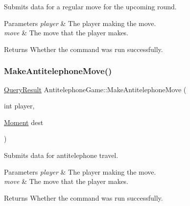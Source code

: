 Submits data for a regular move for the upcoming round. 


\begin{DoxyParams}{Parameters}
{\em player} & The player making the move. \\
\hline
{\em move} & The move that the player makes. \\
\hline
\end{DoxyParams}
\begin{DoxyReturn}{Returns}
Whether the command was run successfully. 
\end{DoxyReturn}
\mbox{\label{class_antitelephone_game_ab0737de4620c0f35eede4c3a8c13da1a}} 
\subsubsection{\texorpdfstring{Make\+Antitelephone\+Move()}{MakeAntitelephoneMove()}}
{\footnotesize\ttfamily \hyperlink{class_query_result}{Query\+Result} Antitelephone\+Game\+::\+Make\+Antitelephone\+Move (\begin{DoxyParamCaption}\item[{int}]{player,  }\item[{\hyperlink{classtimeplane_1_1_moment}{Moment}}]{dest }\end{DoxyParamCaption})}



Submits data for antitelephone travel. 


\begin{DoxyParams}{Parameters}
{\em player} & The player making the move. \\
\hline
{\em move} & The move that the player makes. \\
\hline
\end{DoxyParams}
\begin{DoxyReturn}{Returns}
Whether the command was run successfully. 
\end{DoxyReturn}
\mbox{\label{class_antitelephone_game_a6a5a7e47e245313b53e076fac30ec4d3}} 
